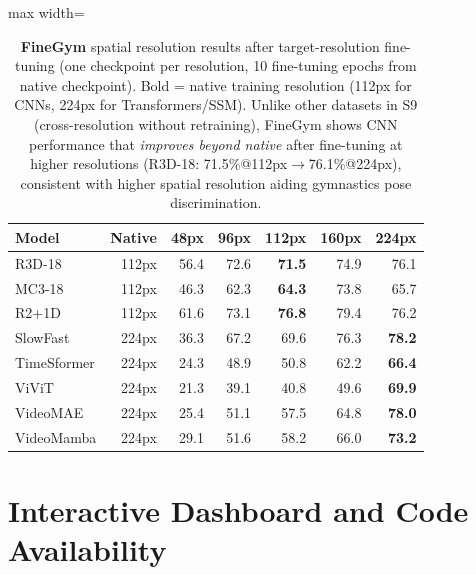 \documentclass[runningheads]{llncs}
\newcommand{\tabtight}{\setlength{\tabcolsep}{3.5pt}\renewcommand{\arraystretch}{1.12}}
\begin{document}
\begin{table}[!htbp]
\centering
\caption{\textbf{FineGym} spatial resolution results after target-resolution fine-tuning (one checkpoint per resolution, 10 fine-tuning epochs from native checkpoint). Bold = native training resolution (112px for CNNs, 224px for Transformers/SSM). Unlike other datasets in S9 (cross-resolution without retraining), FineGym shows CNN performance that \emph{improves beyond native} after fine-tuning at higher resolutions (R3D-18: 71.5\%@112px$\to$76.1\%@224px), consistent with higher spatial resolution aiding gymnastics pose discrimination.}
\label{tab:sup_sp_finegym}
\scriptsize\tabtight
\begin{adjustbox}{max width=\textwidth}
\begin{tabular}{l r rrrrr}
\toprule
Model & Native & 48px & 96px & 112px & 160px & 224px \\
\midrule
R3D-18      & 112px & 56.4 & 72.6 & \textbf{71.5} & 74.9 & 76.1 \\
MC3-18      & 112px & 46.3 & 62.3 & \textbf{64.3} & 73.8 & 65.7 \\
R2+1D       & 112px & 61.6 & 73.1 & \textbf{76.8} & 79.4 & 76.2 \\
SlowFast    & 224px & 36.3 & 67.2 & 69.6 & 76.3 & \textbf{78.2} \\
\midrule
TimeSformer & 224px & 24.3 & 48.9 & 50.8 & 62.2 & \textbf{66.4} \\
ViViT       & 224px & 21.3 & 39.1 & 40.8 & 49.6 & \textbf{69.9} \\
VideoMAE    & 224px & 25.4 & 51.1 & 57.5 & 64.8 & \textbf{78.0} \\
VideoMamba  & 224px & 29.1 & 51.6 & 58.2 & 66.0 & \textbf{73.2} \\
\bottomrule
\end{tabular}
\end{adjustbox}
\end{table}

\section{Interactive Dashboard and Code Availability}
\label{sec:sup_dashboard}
\end{document}
